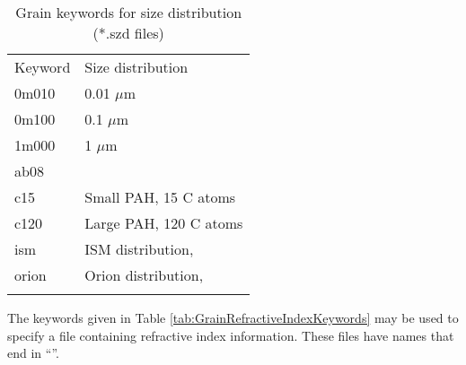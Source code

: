 \begin{table}
\centering
\caption{Grain keywords for size distribution (*.szd files)}
\begin{tabular}{ll}
\hline
Keyword& Size distribution\\
0m010& 0.01 $\mu$m\\
0m100& 0.1 $\mu$m\\
1m000& 1 $\mu$m\\
ab08& \citealp{Abel2008}\\
c15& Small PAH, 15 C atoms\\
c120& Large PAH, 120 C atoms\\
ism& ISM distribution, \citealp{Mathis1977}\\
orion& Orion distribution, \citealp{Baldwin1991}\\
\hline
\label{tab:GrainSizeDistributionKeywords}
\end{tabular}
\end{table}

The keywords given in Table \ref{tab:GrainRefractiveIndexKeywords}
may be used to specify a file containing
refractive index information.
These files have names that end in
``''.

